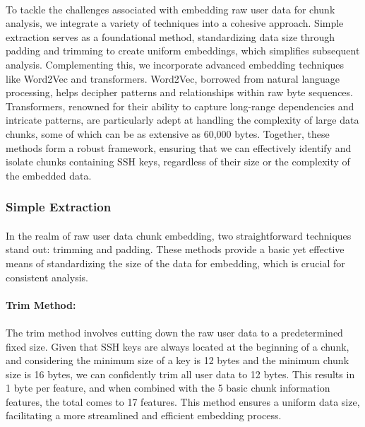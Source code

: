     \paragraph{}To tackle the challenges associated with embedding raw user data for chunk analysis, we integrate a variety of techniques into a cohesive approach. Simple extraction serves as a foundational method, standardizing data size through padding and trimming to create uniform embeddings, which simplifies subsequent analysis. Complementing this, we incorporate advanced embedding techniques like Word2Vec and transformers. Word2Vec, borrowed from natural language processing, helps decipher patterns and relationships within raw byte sequences. Transformers, renowned for their ability to capture long-range dependencies and intricate patterns, are particularly adept at handling the complexity of large data chunks, some of which can be as extensive as 60,000 bytes. Together, these methods form a robust framework, ensuring that we can effectively identify and isolate chunks containing SSH keys, regardless of their size or the complexity of the embedded data.

    \subsubsection{Simple Extraction}
        \paragraph{}In the realm of raw user data chunk embedding, two straightforward techniques stand out: trimming and padding. These methods provide a basic yet effective means of standardizing the size of the data for embedding, which is crucial for consistent analysis.
        
        \paragraph{Trim Method:}
        \paragraph{}The trim method involves cutting down the raw user data to a predetermined fixed size. Given that SSH keys are always located at the beginning of a chunk, and considering the minimum size of a key is 12 bytes and the minimum chunk size is 16 bytes, we can confidently trim all user data to 12 bytes. This results in 1 byte per feature, and when combined with the 5 basic chunk information features, the total comes to 17 features. This method ensures a uniform data size, facilitating a more streamlined and efficient embedding process.
        
